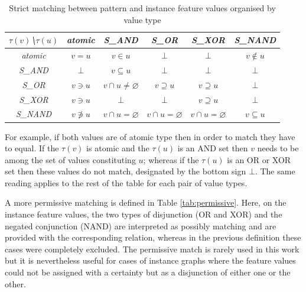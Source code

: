     \begin{table}[!ht]
        \centering
        \begin{tabular}{|c|c|c|c|c|c|}
            \hline
            \textit{$\tau(v)$\textbackslash $\tau(u)$} & \textit{atomic} & \textit{S_{AND}}                 & \textit{S_{OR}}              & \textit{S_{XOR}}             & \textit{S_{NAND}}            \\ \hline
            \textit{atomic}             & $v=u$             & $v \in u$                         & $\bot$                          & $\bot$                          & $v \notin u$                   \\ \hline
            \textit{S_{AND}}              & $\bot$               & $v \subseteq u$                     & $\bot$                          & $\bot$                          & $\bot$ \\ \hline
            \textit{S_{OR}}               & $v \ni u$          & $ v \cap u \neq \varnothing $ &                        $v \supseteq u $              & $v \supseteq u $   & $\bot$ \\ \hline
            \textit{S_{XOR}}              & $v \ni u$          & $\bot$                              & $\bot$                        & $v \supseteq u$             & $\bot$ \\ \hline
            \textit{S_{NAND}}             & $v \not\ni u$      & $v \cap u = \varnothing$     & $v \cap u = \varnothing$ & $v \cap u = \varnothing$ & $ v \subseteq u $                          \\ \hline
        \end{tabular}
        \caption{Strict matching between pattern and instance feature values organised by value type}
        \label{tab:strict}
    \end{table}

    For example, if both values are of atomic type then in order to match they have to equal. If the $\tau(v)$ is atomic and the $\tau(u)$ is an AND set then $v$ needs to be among the set of values constituting $u$; whereas if the $\tau(u)$ is an OR or XOR set then these values do not match, designated by the bottom sign $\bot$. The same reading applies to the rest of the table for each pair of value types. 

    A more permissive matching is defined in Table \ref{tab:permissive}. Here, on the instance feature values, the two types of disjunction (OR and XOR) and the negated conjunction (NAND) are interpreted as possibly matching and are provided with the corresponding relation, whereas in the previous definition these cases were completely excluded. The permissive match is rarely used in this work but it is nevertheless useful for cases of instance graphs where the feature values could not be assigned with a certainty but as a disjunction of either one or the other. 

